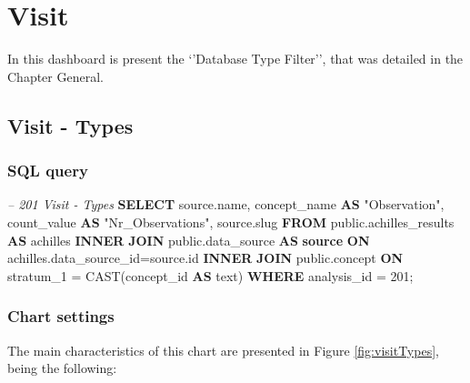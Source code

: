 \documentclass[]{book}
\newenvironment{Shaded}{\begin{snugshade}}{\end{snugshade}}
\newcommand{\KeywordTok}[1]{\textcolor[rgb]{0.13,0.29,0.53}{\textbf{#1}}}
\newcommand{\DecValTok}[1]{\textcolor[rgb]{0.00,0.00,0.81}{#1}}
\newcommand{\CommentTok}[1]{\textcolor[rgb]{0.56,0.35,0.01}{\textit{#1}}}
\newcommand{\OtherTok}[1]{\textcolor[rgb]{0.56,0.35,0.01}{#1}}
\newcommand{\FunctionTok}[1]{\textcolor[rgb]{0.00,0.00,0.00}{#1}}
\newcommand{\NormalTok}[1]{#1}
\begin{document}
\chapter{Visit}\label{visit}

In this dashboard is present the `'Database Type Filter'', that was
detailed in the Chapter General.

\section{Visit - Types}\label{visit---types}

\subsection{SQL query}\label{sql-query-13}

\begin{Shaded}
\begin{Highlighting}[]
\CommentTok{-- 201  Visit - Types}
\KeywordTok{SELECT}\NormalTok{ source.name, }
\NormalTok{       concept_name }\KeywordTok{AS} \OtherTok{"Observation"}\NormalTok{, }
\NormalTok{       count_value }\KeywordTok{AS} \OtherTok{"Nr_Observations"}\NormalTok{,}
\NormalTok{       source.slug}
\KeywordTok{FROM}\NormalTok{ public.achilles_results }\KeywordTok{AS}\NormalTok{ achilles }
    \KeywordTok{INNER} \KeywordTok{JOIN}\NormalTok{ public.data_source }\KeywordTok{AS} \KeywordTok{source} \KeywordTok{ON} 
\NormalTok{      achilles.data_source_id=source.id}
    \KeywordTok{INNER} \KeywordTok{JOIN}\NormalTok{ public.concept }\KeywordTok{ON} 
\NormalTok{      stratum_1 = }\FunctionTok{CAST}\NormalTok{(concept_id }\KeywordTok{AS}\NormalTok{ text)}
\KeywordTok{WHERE}\NormalTok{ analysis_id = }\DecValTok{201}\NormalTok{;}
\end{Highlighting}
\end{Shaded}

\subsection{Chart settings}\label{chart-settings-13}

The main characteristics of this chart are presented in Figure
\ref{fig:visitTypes}, being the following:
\end{document}
